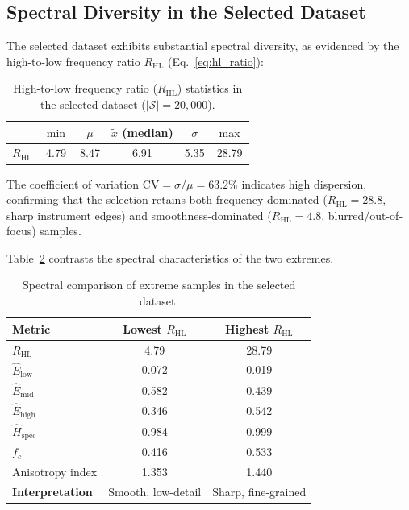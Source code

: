\subsection{Spectral Diversity in the Selected Dataset}
\label{sec:spectral_diversity}

The selected dataset exhibits substantial spectral diversity, as evidenced by
the high-to-low frequency ratio $R_{\text{HL}}$ (Eq.~\ref{eq:hl_ratio}):

\begin{table}[h]
\centering
\caption{High-to-low frequency ratio ($R_{\text{HL}}$) statistics
         in the selected dataset ($|\mathcal{S}|=20{,}000$).}
\label{tab:hl_ratio}
\begin{tabular}{lccccc}
\toprule
& $\min$ & $\mu$ & $\tilde{x}$ (median) & $\sigma$ & $\max$ \\
\midrule
$R_{\text{HL}}$ & 4.79 & 8.47 & 6.91 & 5.35 & 28.79 \\
\bottomrule
\end{tabular}
\end{table}

The coefficient of variation $\text{CV} = \sigma / \mu = 63.2\%$ indicates
high dispersion, confirming that the selection retains both
frequency-dominated ($R_{\text{HL}} = 28.8$, sharp instrument edges) and
smoothness-dominated ($R_{\text{HL}} = 4.8$, blurred/out-of-focus) samples.

Table~\ref{tab:extremes} contrasts the spectral characteristics of the two
extremes.

\begin{table}[h]
\centering
\caption{Spectral comparison of extreme samples in the selected dataset.}
\label{tab:extremes}
\begin{tabular}{lcc}
\toprule
\textbf{Metric} &
    \textbf{Lowest $R_{\text{HL}}$} &
    \textbf{Highest $R_{\text{HL}}$} \\
\midrule
$R_{\text{HL}}$             & 4.79  & 28.79  \\
$\hat{E}_{\text{low}}$      & 0.072 & 0.019  \\
$\hat{E}_{\text{mid}}$      & 0.582 & 0.439  \\
$\hat{E}_{\text{high}}$     & 0.346 & 0.542  \\
$\hat{H}_{\text{spec}}$     & 0.984 & 0.999  \\
$f_c$                       & 0.416 & 0.533  \\
Anisotropy index            & 1.353 & 1.440  \\
\midrule
\textbf{Interpretation}     &
    Smooth, low-detail &
    Sharp, fine-grained \\
\bottomrule
\end{tabular}
\end{table}


